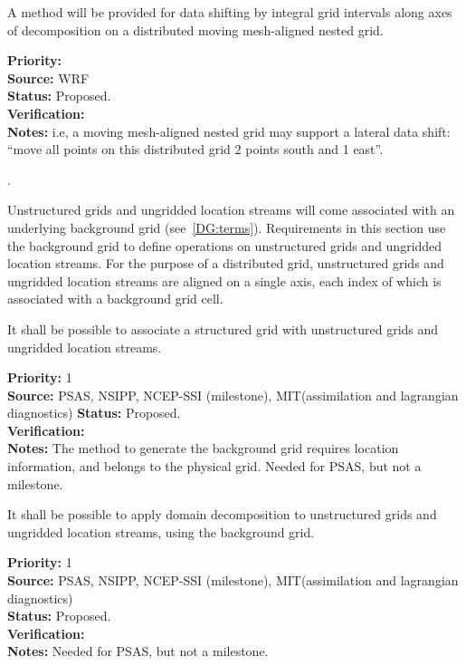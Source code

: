 A method will be provided for data shifting by integral grid intervals
along axes of decomposition on a distributed moving mesh-aligned
nested grid.

\begin{reqlist}
{\bf Priority:} \\
{\bf Source:} WRF \\
{\bf Status:} Proposed. \\
{\bf Verification:} \\
{\bf Notes:} i.e, a moving mesh-aligned nested grid may support a
  lateral data shift: ``move all points on this distributed grid 2
  points south and 1 east''.
\end{reqlist}

 \label{DG:Unstructured}.

Unstructured grids and ungridded location streams will come associated
with an underlying background grid (see~\ref{DG:terms}). Requirements
in this section use the background grid to define operations on
unstructured grids and ungridded location streams. For the purpose of
a distributed grid, unstructured grids and ungridded location streams are
aligned on a single axis, each index of which is associated with a
background grid cell.


It shall be possible to associate a structured grid with unstructured
grids and ungridded location streams.

\begin{reqlist}
{\bf Priority:} 1 \\ 
{\bf Source:} PSAS, NSIPP, NCEP-SSI (milestone), MIT(assimilation  and lagrangian diagnostics)
{\bf Status:} Proposed. \\
{\bf Verification:} \\
{\bf Notes:} The method to generate the background grid requires
  location information, and belongs to the physical grid.  Needed
  for PSAS, but not a milestone.
\end{reqlist}


It shall be possible to apply domain decomposition to unstructured
grids and ungridded location streams, using the background grid.

\begin{reqlist}
{\bf Priority:} 1 \\ 
{\bf Source:} PSAS, NSIPP, NCEP-SSI (milestone), MIT(assimilation  and lagrangian diagnostics) \\
{\bf Status:} Proposed. \\ 
{\bf Verification:} \\
{\bf Notes:}  Needed for PSAS, but not a milestone.
\end{reqlist}

